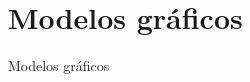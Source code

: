 \documentclass[shownotes]{beamer}
\begin{document}
% 
% 
% 
%   
%  
%   


\section{Modelos gráficos}
\begin{frame}

\centering

 \Large Modelos gr\'aficos
 
\end{frame}
\end{document}
